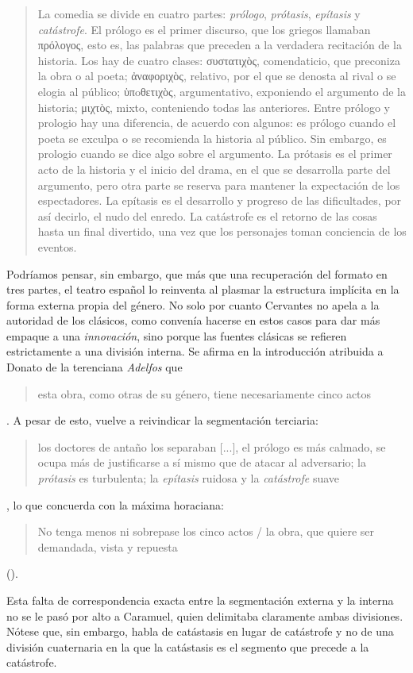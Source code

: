 \blockquote{
	La comedia se divide en cuatro partes: \textit{prólogo}, \textit{prótasis}, \textit{epítasis} y \textit{catástrofe}. El prólogo es el primer discurso, que los griegos llamaban πρόλογος, esto es, las palabras que preceden a la verdadera recitación de la historia. Los hay de cuatro clases: συστατιχὸς, comendaticio, que preconiza la obra o al poeta; ἀναφοριχὸς, relativo, por el que se denosta al rival o se elogia al público; ὑπoθετιχὸς, argumentativo, exponiendo el argumento de la historia; μιχτὸς, mixto, conteniendo todas las anteriores. Entre prólogo y prologio hay una diferencia, de acuerdo con algunos: es prólogo cuando el poeta se exculpa o se recomienda la historia al público. Sin embargo, es prologio cuando se dice algo sobre el argumento. La prótasis es el primer acto de la historia y el inicio del drama, en el que se desarrolla parte del argumento, pero otra parte se reserva para mantener la expectación de los espectadores. La epítasis es el desarrollo y progreso de las dificultades, por así decirlo, el nudo del enredo. La catástrofe es el retorno de las cosas hasta un final divertido, una vez que los personajes toman conciencia de los eventos. \parencite[p. xviii; traducción propia;énfasis en el original]{evanthius300}
}

Podríamos pensar, sin embargo, que más que una recuperación del formato en tres partes, el teatro español lo reinventa al plasmar la estructura implícita en la forma externa propia del género. No solo por cuanto Cervantes no apela a la autoridad de los clásicos, como convenía hacerse en estos casos para dar más empaque a una \textit{innovación}, sino porque las fuentes clásicas se refieren estrictamente a una división interna. Se afirma en la introducción atribuida a Donato de la terenciana \textit{Adelfos} que \blockquote{esta obra, como otras de su género, tiene necesariamente cinco actos} \parencite[pp. 3-4; traducción propia]{donatus300b}. A pesar de esto, vuelve a reivindicar la segmentación terciaria: \blockquote{los doctores de antaño los separaban [...], el prólogo es más calmado, se ocupa más de justificarse a sí mismo que de atacar al adversario; la \textit{prótasis} es turbulenta; la \textit{epítasis} ruidosa y la \textit{catástrofe} suave} \parencite[p. 4; traducción propia]{donatus300b}, lo que concuerda con la máxima horaciana:\blockquote{No tenga menos ni sobrepase los cinco actos / la obra, que quiere ser demandada, vista y repuesta} ().

Esta falta de correspondencia exacta entre la segmentación externa y la interna no se le pasó por alto a Caramuel, quien delimitaba claramente ambas divisiones. Nótese que, sin embargo, habla de catástasis en lugar de catástrofe y no de una división cuaternaria en la que la catástasis es el segmento que precede a la catástrofe.


